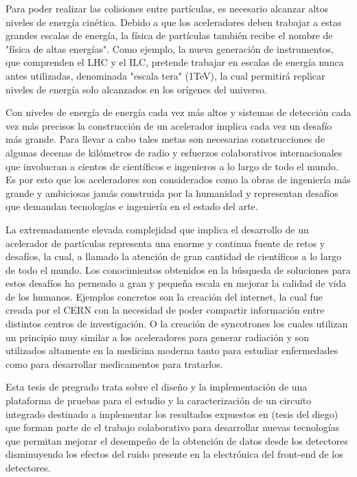 Para poder realizar las colisiones entre partículas, es necesario alcanzar altos niveles de energía cinética. Debido a que los aceleradores deben trabajar a estas grandes escalas de energía, la física de partículas también recibe el nombre de "física de altas energías". Como ejemplo, la nueva generación de instrumentos, que comprenden el LHC y el ILC, pretende trabajar en escalas de energía nunca antes utilizadas, denominada "escala tera" (1TeV), la cual permitirá replicar niveles de energía solo alcanzados en los orígenes del universo. 

Con niveles de energía de energía cada vez más altos y sistemas de detección cada vez más precisos la construcción de un acelerador implica cada vez un desafío más grande. Para llevar a cabo tales metas son necesarias construcciones de algunas decenas de kilómetros de radio y esfuerzos colaborativos internacionales que involucran a cientos de científicos e ingenieros a lo largo de todo el mundo. Es por esto que los aceleradores son considerados como la obras de ingeniería más grande y ambiciosas jamás construida por la humanidad y representan desafíos que demandan tecnologías e ingeniería en el estado del arte.

La extremadamente elevada complejidad que implica el desarrollo de un acelerador de partículas representa una enorme y continua fuente de retos y desafíos, la cual, a llamado la atención de gran cantidad de científicos a lo largo de todo el mundo. Los conocimientos obtenidos en la búsqueda de soluciones para estos desafíos ha perneado a gran y pequeña escala en mejorar la calidad de vida de los humanos. Ejemplos concretos son la creación del internet, la cual fue creada por el CERN con la necesidad de poder compartir información entre distintos centros de investigación. O la creación de syncotrones los cuales utilizan un principio muy similar a los aceleradores para generar radiación y son utilizados altamente en la medicina moderna tanto para estudiar enfermedades como para desarrollar medicamentos para tratarlos.

Esta tesis de pregrado trata sobre el diseño y la implementación de una plataforma de pruebas para el estudio y  la caracterización de un circuito integrado destinado a implementar los resultados expuestos en (tesis del diego) que forman parte de el trabajo colaborativo para desarrollar nuevas tecnologías que permitan mejorar el desempeño de la obtención de datos desde los detectores disminuyendo los efectos del ruido presente en la electrónica del front-end de los detectores.

